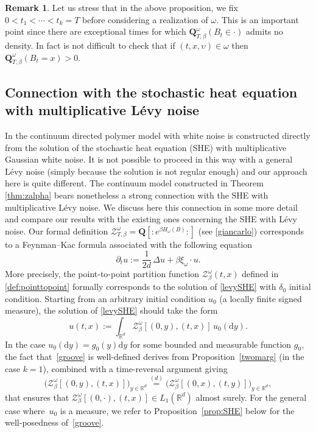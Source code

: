 \documentclass[11pt]{article}
\newcommand{\Subsection}{\subsection}
\numberwithin{equation}{section}
\let\mathcal\mathscr
\theoremstyle{definition}
\newtheorem{rem}[theorem]{Remark}
\newcommand{\dd}{\mathrm{d}}
\newcommand{\cZ}{{\ensuremath{\mathcal Z}} }
\newcommand{\bQ}{{\ensuremath{\mathbf Q}} }
\newcommand{\bbR}{{\ensuremath{\mathbb R}} }
\let\gD\Delta
\let\ups\upsilon
\let\go\omega
\begin{document}
\begin{rem}
Let us stress that in the above proposition,
we fix \hbox{$0\!<\!t_1\!<\!\cdots\!<\!t_k\!=\!T$}
before considering a realization of $\go$.
This is an important point since there are exceptional times for which $\bQ^{\go}_{T,\beta}(B_{t}\in \cdot)$
admits no density. In fact is not difficult to check that if $(t,x,\ups)\in \go$ then
$\bQ^{\go}_{T,\beta}(B_{t}=x)>0$.
\end{rem}

\Subsection{Connection with the stochastic heat equation with multiplicative Lévy noise}
\label{sec:SHE}

In \cite{AKQ14b} the continuum directed polymer model with white noise is constructed direct\-ly from the solution of the stochastic heat equation (SHE) with multiplicative Gaussian white noise. It is not possible to proceed in this way with a general Lévy noise (simply because the solution is not regular enough) and our approach here is quite different.
The continuum model constructed in Theorem \ref{thm:zalpha} bears nonetheless a strong connection
with the SHE with multiplicative Lévy noise. We discuss here this connection in some more detail and compare our results with the existing ones concerning the SHE with Lévy noise.
Our formal definition $\cZ^{\go}_{T,\beta} = \bQ\left[ \mathbf{:}e^{\beta H_\go(B)}\mathbf{:} \right]$ (see \eqref{giancarlo}) corresponds to a Feynman--Kac formula associated with the following equation
\begin{equation}\label{levySHE}
\partial_t u:= \frac{1}{2d}\, \gD u + \beta \xi_{\go} \cdot u.
\end{equation}
More precisely, the point-to-point partition function $\cZ^{\go}_{\beta}(t,x)$ defined in \eqref{def:pointtopoint}
formally corresponds to the solution of \eqref{levySHE} with
$\delta_0$ initial condition.
Starting from an arbitrary initial condition $u_0$ (a locally finite signed measure), the solution of \eqref{levySHE} should take
the form
\begin{equation}\label{groove}
u(t,x):= \int_{\bbR^d} \cZ^{\go}_{\beta}[(0,y),(t,x)] \, u_0(\dd y).
\end{equation}
In the case $u_0(\dd y) = g_0(y) \dd y$ for some bounded and measurable function $g_0$,
the fact that~\eqref{groove}
is well-defined
derives from Proposition~\ref{twomarg} (in the case $k=1$), combined
with a time-reversal argument giving
\[
\bigl(\cZ^{\go}_{\beta}[(0,y),(t,x)] \bigr)_{y \in \bbR^d}\stackrel{(d)}{=} \bigl(\cZ^{\go}_{\beta}[(0,x),(t,y)]\bigr)_{y \in \bbR^d},
\]
that ensures that $\cZ^{\go}_{\beta}[(0,\cdot),(t,x)]\in L_1(\bbR^d)$
almost surely.
For the general case where~$u_0$ is a measure,
we refer to Proposition~\ref{prop:SHE} below
for the well-posedness of~\eqref{groove}.
\end{document}
